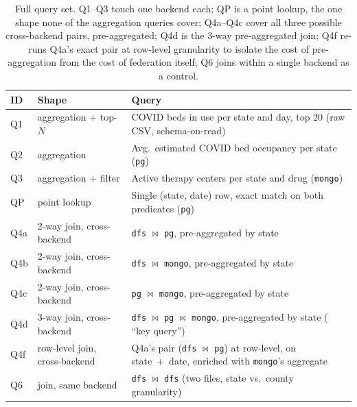 \documentclass[11pt,a4paper]{article}
\begin{document}
\begin{table}[htbp]
\centering
\small
\begin{tabular}{@{}l p{2.6cm} p{9.2cm}@{}}
\toprule
\textbf{ID} & \textbf{Shape} & \textbf{Query} \\
\midrule
Q1  & aggregation + top-$N$          & COVID beds in use per state and day, top 20 (raw CSV, schema-on-read) \\
Q2  & aggregation                    & Avg.\ estimated COVID bed occupancy per state (\texttt{pg}) \\
Q3  & aggregation + filter           & Active therapy centers per state and drug (\texttt{mongo}) \\
QP  & point lookup                   & Single (state, date) row, exact match on both predicates (\texttt{pg}) \\
Q4a & 2-way join, cross-backend      & \texttt{dfs} $\bowtie$ \texttt{pg}, pre-aggregated by state \\
Q4b & 2-way join, cross-backend      & \texttt{dfs} $\bowtie$ \texttt{mongo}, pre-aggregated by state \\
Q4c & 2-way join, cross-backend      & \texttt{pg} $\bowtie$ \texttt{mongo}, pre-aggregated by state \\
Q4d & 3-way join, cross-backend      & \texttt{dfs} $\bowtie$ \texttt{pg} $\bowtie$ \texttt{mongo}, pre-aggregated by state ( ``key query'') \\
Q4f & row-level join, cross-backend  & Q4a's pair (\texttt{dfs} $\bowtie$ \texttt{pg}) at row-level, on state~+~date, enriched with \texttt{mongo}'s aggregate \\
Q6  & join, same backend             & \texttt{dfs} $\bowtie$ \texttt{dfs} (two files, state vs.\ county granularity) \\
\bottomrule
\end{tabular}
\caption{Full query set. Q1--Q3 touch one backend each; QP is a point lookup, the
one shape none of the aggregation queries cover; Q4a--Q4c cover all three
possible cross-backend pairs, pre-aggregated; Q4d is the 3-way pre-aggregated join;
Q4f re-runs Q4a's exact pair at row-level granularity to isolate the cost of
pre-aggregation from the cost of federation itself; Q6 joins within a single
backend as a control.}
\label{tab:queryset}
\end{table}
\end{document}
